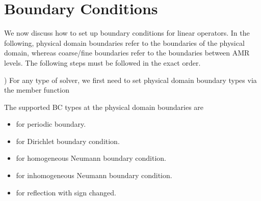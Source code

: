 \documentclass[letterpaper,10pt,english]{sphinxmanual}
\begin{document}
\section{Boundary Conditions}
\label{\detokenize{LinearSolvers:boundary-conditions}}\label{\detokenize{LinearSolvers:sec-linearsolver-bc}}
\sphinxAtStartPar
We now discuss how to set up boundary conditions for linear operators.
In the following, physical domain boundaries refer to the boundaries
of the physical domain, whereas coarse/fine boundaries refer to the
boundaries between AMR levels. The following steps must be
followed in the exact order.

) For any type of solver, we first need to set physical domain boundary types via the  member
function

\begin{sphinxVerbatim}[commandchars=\\\{\}]
      
                     
\end{sphinxVerbatim}

\sphinxAtStartPar
The supported BC types at the physical domain boundaries are
\begin{itemize}
\item {} 
\sphinxAtStartPar
{} for periodic boundary.

\item {} 
\sphinxAtStartPar
{} for Dirichlet boundary condition.

\item {} 
\sphinxAtStartPar
{} for homogeneous Neumann boundary condition.

\item {} 
\sphinxAtStartPar
{} for inhomogeneous Neumann boundary condition.

\item {} 
\sphinxAtStartPar
{} for reflection with sign changed.

\end{itemize}
\end{document}

